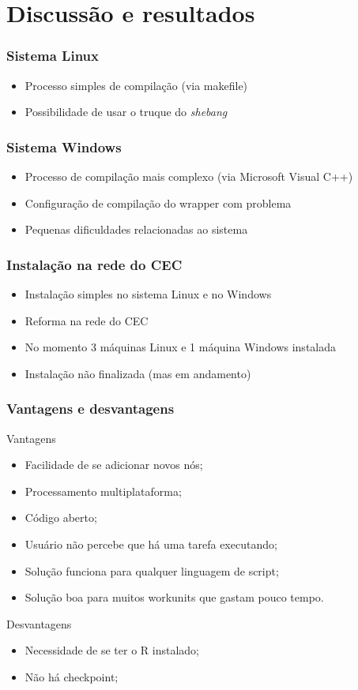 \documentclass{beamer}
\begin{document}
\section{Discussão e resultados} 

\begin{frame}
  \frametitle{Sistema Linux}
  \begin{itemize}
    \item Processo simples de compilação (via makefile)
    \item Possibilidade de usar o truque do \textit{shebang}
  \end{itemize}
\end{frame}

\begin{frame}
  \frametitle{Sistema Windows}
  \begin{itemize}
    \item Processo de compilação mais complexo (via Microsoft Visual C++)
    \item Configuração de compilação do wrapper com problema
    \item Pequenas dificuldades relacionadas ao sistema
  \end{itemize}
\end{frame}

\begin{frame}
  \frametitle{Instalação na rede do CEC}
  \begin{itemize}
    \item Instalação simples no sistema Linux e no Windows
    \item Reforma na rede do CEC
    \item No momento 3 máquinas Linux e 1 máquina Windows instalada
    \item Instalação não finalizada (mas em andamento)
  \end{itemize}
\end{frame}

\begin{frame}
  \frametitle{Vantagens e desvantagens}
  \begin{block}{Vantagens}
  \begin{itemize}
    \item Facilidade de se adicionar novos nós;
    \item Processamento multiplataforma;
    \item Código aberto;
    \item Usuário não percebe que há uma tarefa executando;
    \item Solução funciona para qualquer linguagem de script;
    \item Solução boa para muitos workunits que gastam pouco tempo.
  \end{itemize}
  \end{block}
  \begin{block}{Desvantagens}
  \begin{itemize}
    \item Necessidade de se ter o R instalado;
    \item Não há checkpoint;
  \end{itemize}
  \end{block}
\end{frame}
\end{document}
